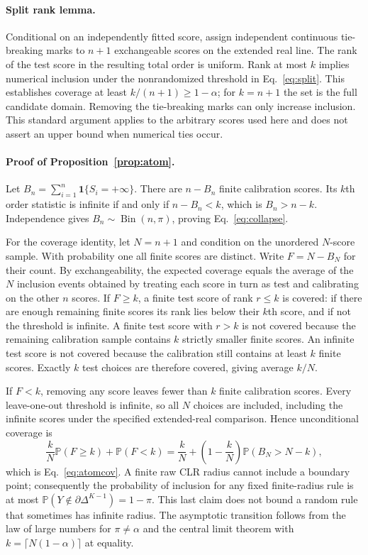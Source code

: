 \documentclass{article}
\newcommand{\D}{\Delta^{K-1}}
\newcommand{\Pp}{\mathbb P}
\newcommand{\ind}{\mathbf 1}
\begin{document}
\paragraph{Split rank lemma.}
Conditional on an independently fitted score, assign independent continuous tie-breaking marks to $n+1$ exchangeable scores on the extended real line. The rank of the test score in the resulting total order is uniform. Rank at most $k$ implies numerical inclusion under the nonrandomized threshold in Eq.~\eqref{eq:split}. This establishes coverage at least $k/(n+1)\ge1-\alpha$; for $k=n+1$ the set is the full candidate domain. Removing the tie-breaking marks can only increase inclusion. This standard argument applies to the arbitrary scores used here and does not assert an upper bound when numerical ties occur.

\paragraph{Proof of Proposition~\ref{prop:atom}.}
Let $B_n=\sum_{i=1}^n\ind\{S_i=+\infty\}$. There are $n-B_n$ finite calibration scores. Its $k$th order statistic is infinite if and only if $n-B_n<k$, which is $B_n>n-k$. Independence gives $B_n\sim\operatorname{Bin}(n,\pi)$, proving Eq.~\eqref{eq:collapse}.

For the coverage identity, let $N=n+1$ and condition on the unordered $N$-score sample. With probability one all finite scores are distinct. Write $F=N-B_N$ for their count. By exchangeability, the expected coverage equals the average of the $N$ inclusion events obtained by treating each score in turn as test and calibrating on the other $n$ scores. If $F\ge k$, a finite test score of rank $r\le k$ is covered: if there are enough remaining finite scores its rank lies below their $k$th score, and if not the threshold is infinite. A finite test score with $r>k$ is not covered because the remaining calibration sample contains $k$ strictly smaller finite scores. An infinite test score is not covered because the calibration still contains at least $k$ finite scores. Exactly $k$ test choices are therefore covered, giving average $k/N$.

If $F<k$, removing any score leaves fewer than $k$ finite calibration scores. Every leave-one-out threshold is infinite, so all $N$ choices are included, including the infinite scores under the specified extended-real comparison. Hence unconditional coverage is
\begin{equation}
 \frac{k}{N}\Pp(F\ge k)+\Pp(F<k)
 =\frac{k}{N}+\left(1-\frac{k}{N}\right)\Pp(B_N>N-k),
\end{equation}
which is Eq.~\eqref{eq:atomcov}. A finite raw CLR radius cannot include a boundary point; consequently the probability of inclusion for any fixed finite-radius rule is at most $\Pp(Y\notin\partial\D)=1-\pi$. This last claim does not bound a random rule that sometimes has infinite radius. The asymptotic transition follows from the law of large numbers for $\pi\ne\alpha$ and the central limit theorem with $k=\lceil N(1-\alpha)\rceil$ at equality.
\end{document}
